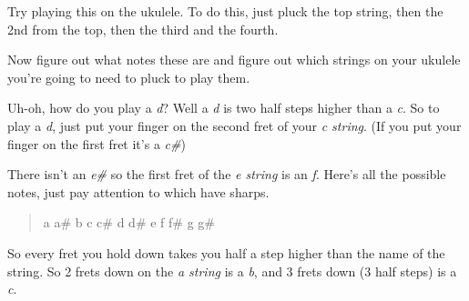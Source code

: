 \documentclass[12pt]{article}
\begin{document}
{%
\parindent 0pt
\noindent
\ifx\preLilyPondExample \undefined
\else
  \expandafter\preLilyPondExample
\fi
\def\lilypondbook{}%

\ifx\postLilyPondExample \undefined
\else
  \expandafter\postLilyPondExample
\fi
}

Try playing this on the ukulele. To do this, just pluck the top string, then the 2nd from the top, then the third and the fourth.

{%
\parindent 0pt
\noindent
\ifx\preLilyPondExample \undefined
\else
  \expandafter\preLilyPondExample
\fi
\def\lilypondbook{}%

\ifx\postLilyPondExample \undefined
\else
  \expandafter\postLilyPondExample
\fi
}

Now figure out what notes these are and figure out which strings on your ukulele you're going to need to pluck to play them.

{%
\parindent 0pt
\noindent
\ifx\preLilyPondExample \undefined
\else
  \expandafter\preLilyPondExample
\fi
\def\lilypondbook{}%

\ifx\postLilyPondExample \undefined
\else
  \expandafter\postLilyPondExample
\fi
}

Uh-oh, how do you play a \emph{d}? Well a \emph{d} is two half steps higher than a \emph{c}. So to play a \emph{d}, just put your finger on the second fret of your \emph{c string}. (If you put your finger on the first fret it's a \emph{c\#})

{%
\parindent 0pt
\noindent
\ifx\preLilyPondExample \undefined
\else
  \expandafter\preLilyPondExample
\fi
\def\lilypondbook{}%

\ifx\postLilyPondExample \undefined
\else
  \expandafter\postLilyPondExample
\fi
}

There isn't an \emph{e\#} so the first fret of the \emph{e string} is an \emph{f}.
Here's all the possible notes, just pay attention to which have sharps.
\begin{quote}
a a\# b c c\# d d\# e f f\# g g\#
\end{quote}

So every fret you hold down takes you half a step higher than the name of the string. So 2 frets down on the \emph{a string} is a \emph{b}, and 3 frets down (3 half steps) is a \emph{c}.

{%
\parindent 0pt
\noindent
\ifx\preLilyPondExample \undefined
\else
  \expandafter\preLilyPondExample
\fi
\def\lilypondbook{}%

\ifx\postLilyPondExample \undefined
\else
  \expandafter\postLilyPondExample
\fi
}
\end{document}
